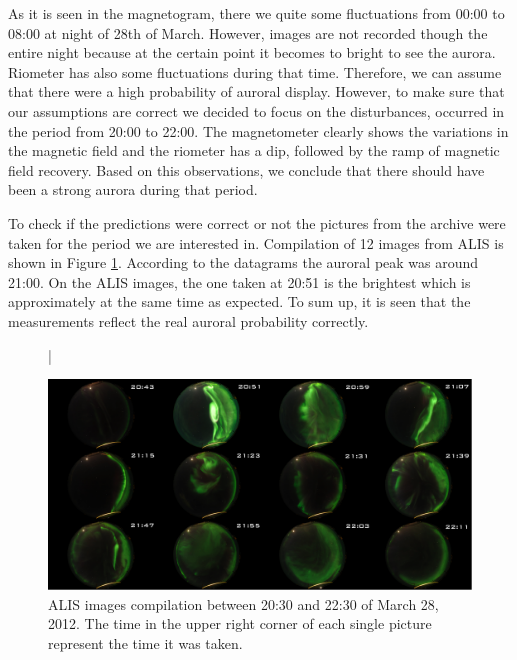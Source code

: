 \documentclass{article}
\begin{document}
As it is seen in the magnetogram, there we quite some fluctuations from 00:00 to 08:00 at night of 28th of March. However, images are not recorded though the entire night because at the certain point it becomes to bright to see the aurora. Riometer has also some fluctuations during that time. Therefore, we can assume that there were a high probability of auroral display. However, to make sure that our assumptions are correct we decided to focus on the disturbances, occurred in the period from 20:00 to 22:00. The magnetometer clearly shows the variations in the magnetic field and the riometer has a dip, followed by the ramp of magnetic field recovery. Based on this observations, we conclude that there should have been a strong aurora during that period.

To check if the predictions were correct or not the pictures from the archive were taken for the period we are interested in. Compilation of 12 images from ALIS is shown in Figure \ref{fig:ALIS}. According to the datagrams the auroral peak was around 21:00. On the ALIS images, the one taken at 20:51 is the brightest which is approximately at the same time as expected. To sum up, it is seen that the measurements reflect the real auroral probability correctly.

\begin{figure}[htbp!]
\centering|
\centerline{\includegraphics[width=\textwidth]{Figures/awowa.png}}
\caption{ALIS images compilation between 20:30 and 22:30 of March 28, 2012. The time in the upper right corner of each single picture represent the time it was taken.}
\label{fig:ALIS}
\end{figure}


\end{document}
